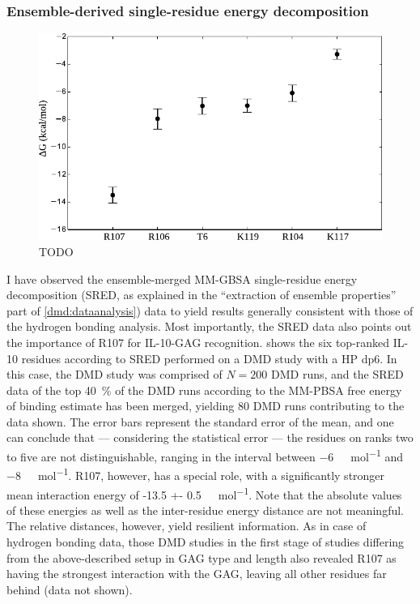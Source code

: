 \subsubsection{Ensemble-derived single-residue energy decomposition}

\begin{figure}
\centering
\includegraphics[width=1.0\textwidth]{gfx/dmdil10/round1_il10_SRED_hpdp6.pdf}
\caption[]{TODO}
\label{fig:dmdil10:SRED_hpdp6}
\end{figure}

I have observed the ensemble-merged MM-GBSA single-residue energy decomposition
(SRED, as explained in the \enquote{extraction of ensemble properties} part of
\cref{dmd:dataanalysis}) data to yield results generally consistent with those
of the hydrogen bonding analysis. Most importantly, the SRED data also points
out the importance of R107 for IL-10-GAG recognition.
 shows the six top-ranked IL-10 residues according
to SRED performed on a DMD study with a HP dp6. In this case, the DMD study was
comprised of $N=200$ DMD runs, and the SRED data of the top \SI{40}{\percent} of
the DMD runs according to the MM-PBSA free energy of binding estimate has been
merged, yielding 80 DMD runs contributing to the data shown. The error bars
represent the standard error of the mean, and one can conclude that ---
considering the statistical error --- the residues on ranks two to five are not
distinguishable, ranging in the interval between \SI{-6}{\kilo\calory\per\mol}
and \SI{-8}{\kilo\calory\per\mol}. R107, however, has a special role, with a
significantly stronger mean interaction energy of \SI{-13.5 +-
0.5}{\kilo\calory\per\mol}. Note that the absolute values of these energies as
well as the inter-residue energy distance are not meaningful. The relative
distances, however, yield resilient information. As in case of hydrogen bonding
data, those DMD studies in the first stage of studies differing from the
above-described setup in GAG type and length also revealed R107 as having the
strongest interaction with the GAG, leaving all other residues far behind (data
not shown).

